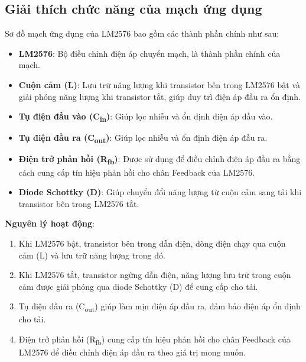         \subsection{Giải thích chức năng của mạch ứng dụng}
            \hspace*{0.6cm}Sơ đồ mạch ứng dụng của LM2576 bao gồm các thành phần chính như sau:
            
            \begin{itemize}
                \item \textbf{LM2576}: Bộ điều chỉnh điện áp chuyển mạch, là thành phần chính của mạch.
                \item \textbf{Cuộn cảm (L)}: Lưu trữ năng lượng khi transistor bên trong LM2576 bật và giải phóng năng lượng khi transistor tắt, giúp duy trì điện áp đầu ra ổn định.
                \item \textbf{Tụ điện đầu vào (C\textsubscript{in})}: Giúp lọc nhiễu và ổn định điện áp đầu vào.
                \item \textbf{Tụ điện đầu ra (C\textsubscript{out})}: Giúp lọc nhiễu và ổn định điện áp đầu ra.
                \item \textbf{Điện trở phản hồi (R\textsubscript{fb})}: Được sử dụng để điều chỉnh điện áp đầu ra bằng cách cung cấp tín hiệu phản hồi cho chân Feedback của LM2576.
                \item \textbf{Diode Schottky (D)}: Giúp chuyển đổi năng lượng từ cuộn cảm sang tải khi transistor bên trong LM2576 tắt.
            \end{itemize}
            
            \textbf{Nguyên lý hoạt động}:
            \begin{enumerate}
                \item Khi LM2576 bật, transistor bên trong dẫn điện, dòng điện chạy qua cuộn cảm (L) và lưu trữ năng lượng trong đó.
                \item Khi LM2576 tắt, transistor ngừng dẫn điện, năng lượng lưu trữ trong cuộn cảm được giải phóng qua diode Schottky (D) để cung cấp cho tải.
                \item Tụ điện đầu ra (C\textsubscript{out}) giúp làm mịn điện áp đầu ra, đảm bảo điện áp ổn định cho tải.
                \item Điện trở phản hồi (R\textsubscript{fb}) cung cấp tín hiệu phản hồi cho chân Feedback của LM2576 để điều chỉnh điện áp đầu ra theo giá trị mong muốn.
            \end{enumerate}
            
